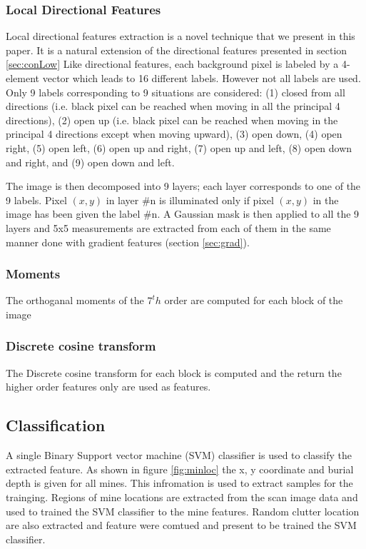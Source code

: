 \documentclass[conference]{IEEEtran}
\begin{document}
\begin{enumerate}

\end{enumerate}
\subsubsection {Local Directional Features}
Local directional features extraction is a novel technique that we present in this paper. It is a natural extension of the directional features presented in section \ref{sec:conLow}  Like directional features, each background pixel is labeled by a 4-element vector which leads to 16 different labels. However not all labels are used. Only 9 labels corresponding to 9 situations are considered: (1) closed from all directions (i.e. black pixel can be reached when moving in all the principal 4 directions), (2) open up (i.e. black pixel can be reached when moving in the principal 4 directions except when moving upward), (3) open down, (4) open right, (5) open left, (6) open up and right, (7) open up and left, (8) open down and right, and (9) open down and left.

The image is then decomposed into 9 layers; each layer corresponds to one of the 9 labels. Pixel $(x,y)$ in layer #n is illuminated only if pixel $(x,y)$ in the image has been given the label #n. A Gaussian mask is then applied to all the 9 layers and 5x5 measurements are extracted from each of them in the same manner done with gradient features (section \ref{sec:grad}).

\subsubsection {Moments}
The orthoganal moments of the $7^th$ order are computed for each block of the image
\subsubsection {Discrete cosine transform}
The Discrete cosine transform for each block is computed and the return the higher order features only are used as features.

\subsection {Classification}
A single Binary Support vector machine (SVM) classifier is used to classify the extracted feature.  As shown in figure \ref{fig:minloc} the x, y  coordinate and burial depth is given for all mines. This infromation is used to extract samples for the trainging. Regions of mine locations  are extracted from the scan image data and used to trained the SVM classifier to the mine features. Random clutter location are also extracted and feature were comtued and present to be trained the SVM classifier.
\end{document}
